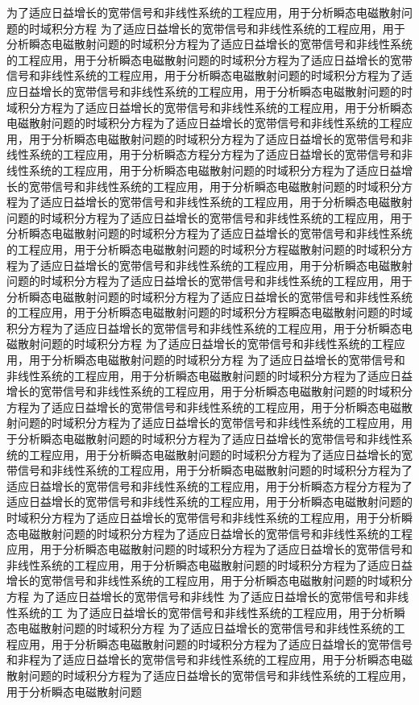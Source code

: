 \begin{englishabstract}
为了适应日益增长的宽带信号和非线性系统的工程应用，用于分析瞬态电磁散射问题的时域积分方程
为了适应日益增长的宽带信号和非线性系统的工程应用，用于分析瞬态电磁散射问题的时域积分方程为了适应日益增长的宽带信号和非线性系统的工程应用，用于分析瞬态电磁散射问题的时域积分方程为了适应日益增长的宽带信号和非线性系统的工程应用，用于分析瞬态电磁散射问题的时域积分方程为了适应日益增长的宽带信号和非线性系统的工程应用，用于分析瞬态电磁散射问题的时域积分方程为了适应日益增长的宽带信号和非线性系统的工程应用，用于分析瞬态电磁散射问题的时域积分方程为了适应日益增长的宽带信号和非线性系统的工程应用，用于分析瞬态电磁散射问题的时域积分方程为了适应日益增长的宽带信号和非线性系统的工程应用，用于分析瞬态方程分方程为了适应日益增长的宽带信号和非线性系统的工程应用，用于分析瞬态电磁散射问题的时域积分方程为了适应日益增长的宽带信号和非线性系统的工程应用，用于分析瞬态电磁散射问题的时域积分方程为了适应日益增长的宽带信号和非线性系统的工程应用，用于分析瞬态电磁散射问题的时域积分方程为了适应日益增长的宽带信号和非线性系统的工程应用，用于分析瞬态电磁散射问题的时域积分方程为了适应日益增长的宽带信号和非线性系统的工程应用，用于分析瞬态电磁散射问题的时域积分方程磁散射问题的时域积分方程为了适应日益增长的宽带信号和非线性系统的工程应用，用于分析瞬态电磁散射问题的时域积分方程为了适应日益增长的宽带信号和非线性系统的工程应用，用于分析瞬态电磁散射问题的时域积分方程为了适应日益增长的宽带信号和非线性系统的工程应用，用于分析瞬态电磁散射问题的时域积分方程瞬态电磁散射问题的时域积分方程为了适应日益增长的宽带信号和非线性系统的工程应用，用于分析瞬态电磁散射问题的时域积分方程
为了适应日益增长的宽带信号和非线性系统的工程应用，用于分析瞬态电磁散射问题的时域积分方程
为了适应日益增长的宽带信号和非线性系统的工程应用，用于分析瞬态电磁散射问题的时域积分方程为了适应日益增长的宽带信号和非线性系统的工程应用，用于分析瞬态电磁散射问题的时域积分方程为了适应日益增长的宽带信号和非线性系统的工程应用，用于分析瞬态电磁散射问题的时域积分方程为了适应日益增长的宽带信号和非线性系统的工程应用，用于分析瞬态电磁散射问题的时域积分方程为了适应日益增长的宽带信号和非线性系统的工程应用，用于分析瞬态电磁散射问题的时域积分方程为了适应日益增长的宽带信号和非线性系统的工程应用，用于分析瞬态电磁散射问题的时域积分方程为了适应日益增长的宽带信号和非线性系统的工程应用，用于分析瞬态方程分方程为了适应日益增长的宽带信号和非线性系统的工程应用，用于分析瞬态电磁散射问题的时域积分方程为了适应日益增长的宽带信号和非线性系统的工程应用，用于分析瞬态电磁散射问题的时域积分方程为了适应日益增长的宽带信号和非线性系统的工程应用，用于分析瞬态电磁散射问题的时域积分方程为了适应日益增长的宽带信号和非线性系统的工程应用，用于分析瞬态电磁散射问题的时域积分方程为了适应日益增长的宽带信号和非线性系统的工程应用，用于分析瞬态电磁散射问题的时域积分方程
为了适应日益增长的宽带信号和非线性
为了适应日益增长的宽带信号和非线性系统的工
为了适应日益增长的宽带信号和非线性系统的工程应用，用于分析瞬态电磁散射问题的时域积分方程
为了适应日益增长的宽带信号和非线性系统的工程应用，用于分析瞬态电磁散射问题的时域积分方程为了适应日益增长的宽带信号和非程为了适应日益增长的宽带信号和非线性系统的工程应用，用于分析瞬态电磁散射问题的时域积分方程为了适应日益增长的宽带信号和非线性系统的工程应用，用于分析瞬态电磁散射问题

\end{englishabstract}